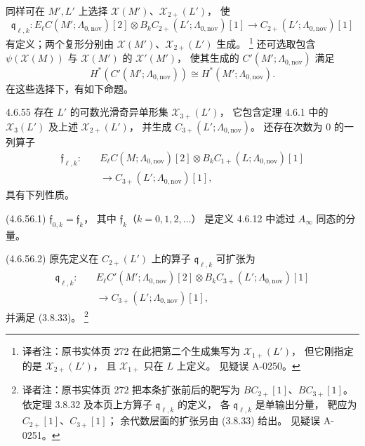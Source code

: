 同样可在 $M',L'$ 上选择
$\mathcal X(M')$、$\mathcal X_{2+}(L')$，
使
\[
\mathfrak q_{\ell,k}\colon
E_\ell C(M';\Lambda_{0,\mathrm{nov}})[2]
\otimes B_kC_{2+}(L';\Lambda_{0,\mathrm{nov}})[1]
\longrightarrow
C_{2+}(L';\Lambda_{0,\mathrm{nov}})[1]
\]
有定义；两个复形分别由
$\mathcal X(M')$、$\mathcal X_{2+}(L')$ 生成。
\footnote{译者注：原书实体页 272
在此把第二个生成集写为
$\mathcal X_{1+}(L')$，
但它刚指定的是 $\mathcal X_{2+}(L')$，
且 $\mathcal X_{1+}$ 只在 $L$ 上定义。
见疑误 A-0250。}
还可选取包含
$\psi(\mathcal X(M))$ 与 $\mathcal X(M')$
的 $\mathcal X'(M')$，
使其生成的 $C'(M';\Lambda_{0,\mathrm{nov}})$
满足
\[
H^*(C'(M';\Lambda_{0,\mathrm{nov}}))
\cong H^*(M';\Lambda_{0,\mathrm{nov}}).
\]
在这些选择下，有如下命题。

\begin{proposition}{4.6.55}\label{prop:4-6-55}
存在 $L'$ 的可数光滑奇异单形集
$\mathcal X_{3+}(L')$，
它包含定理 4.6.1 中的 $\mathcal X_3(L')$
及上述 $\mathcal X_{2+}(L')$，
并生成 $C_{3+}(L';\Lambda_{0,\mathrm{nov}})$。
还存在次数为 $0$ 的一列算子
\[
\begin{aligned}
\mathfrak f_{\ell,k}\colon\quad
&E_\ell C(M;\Lambda_{0,\mathrm{nov}})[2]
\otimes B_kC_{1+}(L;\Lambda_{0,\mathrm{nov}})[1]\\
&\longrightarrow C_{3+}(L';\Lambda_{0,\mathrm{nov}})[1],
\end{aligned}
\]
具有下列性质。

\noindent\textup{(4.6.56.1)}
$\mathfrak f_{0,k}=\mathfrak f_k$，
其中 $\mathfrak f_k$（$k=0,1,2,\ldots$）
是定义 4.6.12 中滤过 $A_\infty$ 同态的分量。

\noindent\textup{(4.6.56.2)}
原先定义在 $C_{2+}(L')$ 上的算子
$\mathfrak q_{\ell,k}$ 可扩张为
\[
\begin{aligned}
\mathfrak q_{\ell,k}\colon\quad
&E_\ell C'(M';\Lambda_{0,\mathrm{nov}})[2]
\otimes B_kC_{3+}(L';\Lambda_{0,\mathrm{nov}})[1]\\
&\longrightarrow C_{3+}(L';\Lambda_{0,\mathrm{nov}})[1],
\end{aligned}
\]
并满足 (3.8.33)。
\footnote{译者注：原书实体页 272
把本条扩张前后的靶写为
$BC_{2+}[1]$、$BC_{3+}[1]$。
依定理 3.8.32 及本页上方算子
$\mathfrak q_{\ell,k}$ 的定义，
各 $\mathfrak q_{\ell,k}$ 是单输出分量，
靶应为 $C_{2+}[1]$、$C_{3+}[1]$；
余代数层面的扩张另由 (3.8.33) 给出。
见疑误 A-0251。}


\end{proposition}
